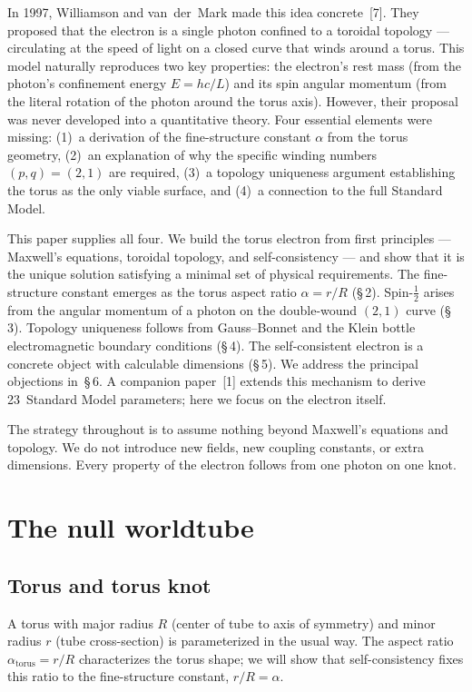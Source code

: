 \documentclass[10pt,twoside,a5paper]{article}
\begin{document}
In 1997, Williamson and van~der~Mark made this idea concrete~[7]. They proposed that the electron is a single photon confined to a toroidal topology --- circulating at the speed of light on a closed curve that winds around a torus. This model naturally reproduces two key properties: the electron's rest mass (from the photon's confinement energy $E = hc/L$) and its spin angular momentum (from the literal rotation of the photon around the torus axis). However, their proposal was never developed into a quantitative theory. Four essential elements were missing: (1)~a derivation of the fine-structure constant $\alpha$ from the torus geometry, (2)~an explanation of why the specific winding numbers $(p,q) = (2,1)$ are required, (3)~a topology uniqueness argument establishing the torus as the only viable surface, and (4)~a connection to the full Standard Model.

This paper supplies all four. We build the torus electron from first principles --- Maxwell's equations, toroidal topology, and self-consistency --- and show that it is the unique solution satisfying a minimal set of physical requirements. The fine-structure constant emerges as the torus aspect ratio $\alpha = r/R$ (\S\,2). Spin-$\frac{1}{2}$ arises from the angular momentum of a photon on the double-wound $(2,1)$ curve (\S\,3). Topology uniqueness follows from Gauss--Bonnet and the Klein bottle electromagnetic boundary conditions (\S\,4). The self-consistent electron is a concrete object with calculable dimensions (\S\,5). We address the principal objections in~\S\,6. A companion paper~[1] extends this mechanism to derive 23~Standard Model parameters; here we focus on the electron itself.

The strategy throughout is to assume nothing beyond Maxwell's equations and topology. We do not introduce new fields, new coupling constants, or extra dimensions. Every property of the electron follows from one photon on one knot.


\section{The null worldtube}

\subsection{Torus and torus knot}

A torus with major radius $R$ (center of tube to axis of symmetry) and minor radius $r$ (tube cross-section) is parameterized in the usual way. The aspect ratio $\alpha_{\text{torus}} = r/R$ characterizes the torus shape; we will show that self-consistency fixes this ratio to the fine-structure constant, $r/R = \alpha$.
\end{document}

